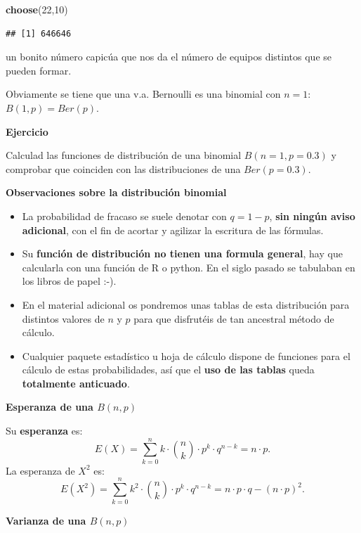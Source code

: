\documentclass[]{book}
\newenvironment{Shaded}{\begin{snugshade}}{\end{snugshade}}
\newcommand{\DecValTok}[1]{\textcolor[rgb]{0.00,0.00,0.81}{#1}}
\newcommand{\KeywordTok}[1]{\textcolor[rgb]{0.13,0.29,0.53}{\textbf{#1}}}
\newcommand{\NormalTok}[1]{#1}
\providecommand{\tightlist}{%
  \setlength{\itemsep}{0pt}\setlength{\parskip}{0pt}}
\begin{document}
\begin{Shaded}
\begin{Highlighting}[]
\KeywordTok{choose}\NormalTok{(}\DecValTok{22}\NormalTok{,}\DecValTok{10}\NormalTok{)}
\end{Highlighting}
\end{Shaded}

\begin{verbatim}
## [1] 646646
\end{verbatim}

un bonito número capicúa que nos da el número de equipos distintos que se pueden formar.

Obviamente se tiene que una v.a. Bernoulli es una binomial con \(n=1\):
\(B(1,p)=Ber(p).\)

\textbf{Ejercicio}

Calculad las funciones de distribución de una binomial \(B(n=1,p=0.3)\) y comprobar que coinciden con las distribuciones de una \(Ber(p=0.3)\).

\textbf{Observaciones sobre la distribución binomial}

\begin{itemize}
\tightlist
\item
  La probabilidad de fracaso se suele denotar con \(q=1-p\), \textbf{sin ningún aviso adicional}, con el fin de acortar y agilizar la escritura de las fórmulas.
\item
  Su \textbf{función de distribución no tienen una formula general}, hay que calcularla con una función de R o python. En el siglo pasado se tabulaban en los libros de papel :-).
\item
  En el material adicional os pondremos unas tablas de esta distribución
  para distintos valores de \(n\) y \(p\) para que disfrutéis de tan ancestral método de cálculo.
\item
  Cualquier paquete estadístico u hoja de cálculo dispone de
  funciones para el cálculo de estas probabilidades, así que el \textbf{uso de las tablas} queda \textbf{totalmente anticuado}.
\end{itemize}

\textbf{Esperanza de una \(B(n,p)\)}

Su \textbf{esperanza} es:
\[E(X)=\displaystyle\sum_{k=0}^n k \cdot  {n \choose k }\cdot p^k\cdot q^{n-k} = n\cdot p.\]
La esperanza de \(X^2\) es:
\[
E(X^2)= \displaystyle\sum_{k=0}^n k^2 \cdot  {n \choose k }\cdot p^k\cdot q^{n-k}= n\cdot p\cdot q-(n\cdot p)^2.
\]

\textbf{Varianza de una \(B(n,p)\)}
\end{document}
